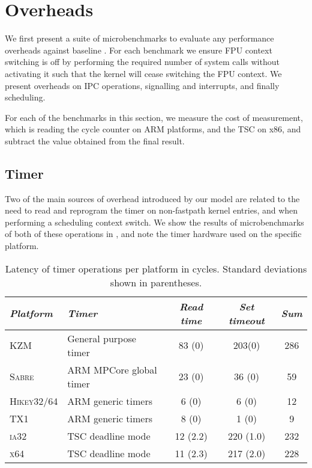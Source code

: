 \section{Overheads}

We first present a suite of microbenchmarks to evaluate any performance overheads against baseline
\selfour.
For each benchmark we ensure \gls{FPU} context switching is off by performing the required number of 
system calls 
without activating it such that the kernel will cease switching the FPU context. We present
overheads on IPC operations, signalling and interrupts, and finally scheduling. 

For each of the benchmarks in this section, we measure the cost of measurement, which is reading the
cycle counter on ARM platforms, and the \gls{TSC} on x86, and subtract the value obtained
from the final result.

\subsection{Timer}
\label{s:eval-timer}

Two of the main sources of overhead introduced by our model are related to the need to read and
reprogram the timer on non-fastpath kernel entries, and when performing a scheduling context switch.
We show the results of microbenchmarks of both of these operations in , and
note the timer hardware used on the specific platform. 

\begin{table}[t]\centering
{}
\begin{tabularx}{\textwidth}{lXccc}\toprule
    \emph{Platform} & \emph{Timer} & \emph{Read time} & \emph{Set timeout} & \emph{Sum}
    \\\midrule
    \textsc{KZM}               & General purpose timer    & 83 (0)   & 203(0)  & 286   \\
    \textsc{Sabre}             & ARM MPCore global timer  & 23 (0)   & 36 (0)  & 59    \\
    \textsc{Hikey32/64}        & ARM generic timers       &  6 (0)   &  6 (0)  & 12    \\
    \textsc{TX1}               & ARM generic timers       &  8 (0)   &  1 (0)  & 9     \\
    \textsc{ia32}              & TSC deadline mode        & 12 (2.2) & 220 (1.0) & 232 \\
    \textsc{x64}               & TSC deadline mode        & 11 (2.3) & 217 (2.0) & 228 \\
    \bottomrule\hline
\end{tabularx}
\caption[Latency of timer operations.]{Latency of timer operations per platform in cycles. Standard deviations shown
in parentheses.}
\label{t:evaluation-timer}
\end{table}

